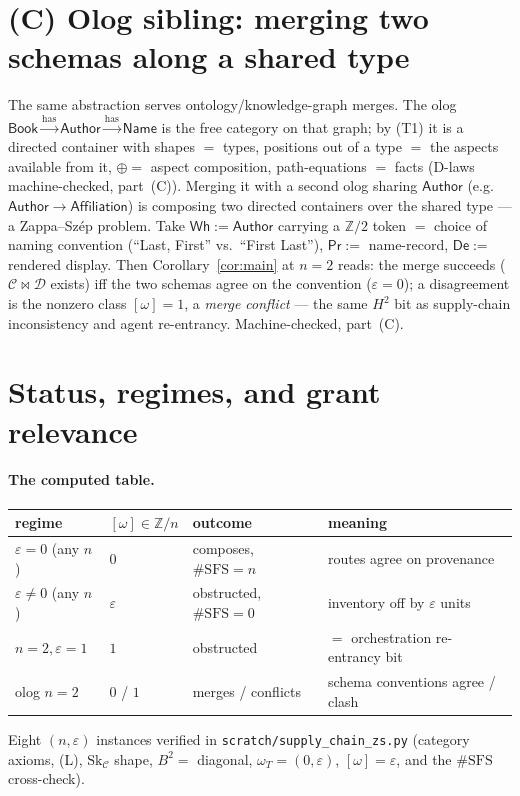 \documentclass[11pt]{article}
\theoremstyle{definition}
\newcommand{\C}{\mathcal{C}}
\newcommand{\D}{\mathcal{D}}
\newcommand{\Sk}{\mathrm{Sk}}
\newcommand{\Wh}{\mathsf{Wh}}
\newcommand{\Prc}{\mathsf{Pr}}
\newcommand{\De}{\mathsf{De}}
\newcommand{\Zn}{\mathbb{Z}/n}
\begin{document}
\section{(C) Olog sibling: merging two schemas along a shared type}\label{sec:olog}

The same abstraction serves ontology/knowledge-graph merges. The olog
$\mathsf{Book}\xrightarrow{\text{has}}\mathsf{Author}\xrightarrow{\text{has}}
\mathsf{Name}$ is the free category on that graph; by (T1) it is a directed container
with shapes $=$ types, positions out of a type $=$ the aspects available from it,
$\oplus=$ aspect composition, path-equations $=$ facts (D-laws machine-checked,
part~(C)). Merging it with a second olog sharing $\mathsf{Author}$ (e.g.\
$\mathsf{Author}\to\mathsf{Affiliation}$) is composing two directed containers over the
shared type --- a Zappa--Sz\'ep problem. Take $\Wh:=\mathsf{Author}$ carrying a
$\mathbb Z/2$ token $=$ choice of naming convention (``Last, First'' vs.\ ``First
Last''), $\Prc:=$ name-record, $\De:=$ rendered display. Then
Corollary~\ref{cor:main} at $n=2$ reads: the merge succeeds ($\C\bowtie\D$ exists) iff
the two schemas agree on the convention ($\varepsilon=0$); a disagreement is the
nonzero class $[\omega]=1$, a \emph{merge conflict} --- the same $H^2$ bit as
supply-chain inconsistency and agent re-entrancy. Machine-checked, part~(C).

\section{Status, regimes, and grant relevance}\label{sec:status}

\paragraph{The computed table.}
\begin{center}
\begin{tabular}{@{}llll@{}}
\toprule
regime & $[\omega]\in\Zn$ & outcome & meaning \\
\midrule
$\varepsilon=0$ (any $n$) & $0$ & composes, $\#\mathrm{SFS}=n$ & routes agree on provenance \\
$\varepsilon\ne0$ (any $n$) & $\varepsilon$ & obstructed, $\#\mathrm{SFS}=0$ & inventory off by $\varepsilon$ units \\
$n=2,\varepsilon=1$ & $1$ & obstructed & $=$ orchestration re-entrancy bit \cite{orch} \\
olog $n=2$ & $0$ / $1$ & merges / conflicts & schema conventions agree / clash \\
\bottomrule
\end{tabular}
\end{center}
Eight $(n,\varepsilon)$ instances verified in \texttt{scratch/supply\_chain\_zs.py}
(category axioms, (L), $\Sk_\C$ shape, $B^2=$ diagonal, $\omega_T=(0,\varepsilon)$,
$[\omega]=\varepsilon$, and the $\#\mathrm{SFS}$ cross-check).
\end{document}
